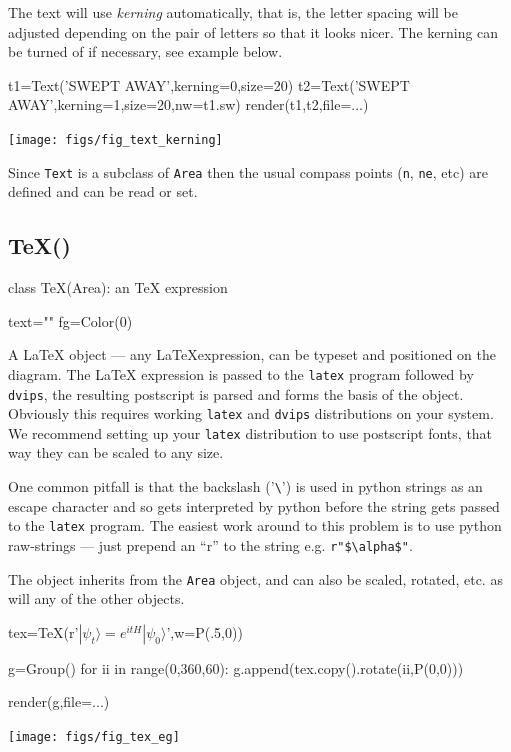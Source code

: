 \documentclass[a4paper]{book}
\begin{document}
The text will use \emph{kerning} automatically, that is, the
letter spacing will be adjusted depending on the pair of letters so
that it looks nicer. The kerning can be turned of if necessary, see
example below.
\begin{example}
\begin{python}
t1=Text('SWEPT AWAY',kerning=0,size=20)
t2=Text('SWEPT AWAY',kerning=1,size=20,nw=t1.sw)
render(t1,t2,file=...)
\end{python}
\begin{center}
  \texttt{[image: figs/fig\_text\_kerning]}
\end{center}
\end{example}

Since \Verb|Text| is a subclass of \Verb|Area| then the usual compass points
(\Verb|n|, \Verb|ne|, etc) are defined and can be read or set.

\subsection{TeX()}
\label{sec:tex}
\begin{python}
class TeX(Area):
    an TeX expression

    text=""
    fg=Color(0)
\end{python}

A \LaTeX{} object --- any \LaTeX expression, can be typeset and
positioned on the diagram.  The \LaTeX{} expression is passed to the
\Verb|latex| program followed by \Verb|dvips|, the resulting
postscript is parsed and forms the basis of the object. Obviously this
requires working \Verb|latex| and \Verb|dvips| distributions on your
system. We recommend setting up your \Verb|latex| distribution to
use postscript fonts, that way they can be scaled to any size.

One common pitfall is that the backslash ('\Verb|\|') is used in python
strings as an escape character and so gets interpreted by python before
the string gets passed to the \Verb|latex| program. The easiest work
around to this problem is to use python raw-strings --- just prepend an
``r'' to the string e.g. \Verb|r"$\alpha$"|.

The object inherits from the \Verb|Area| object, and can also be
scaled, rotated, etc. as will any of the other objects.
\begin{example}
\begin{python}
tex=TeX(r'$|\psi_t\rangle=e^{itH}|\psi_0\rangle$',w=P(.5,0))

g=Group()
for ii in range(0,360,60):
    g.append(tex.copy().rotate(ii,P(0,0)))

render(g,file=...)
\end{python}
\begin{center}
  \texttt{[image: figs/fig\_tex\_eg]}
\end{center}
\end{example}
\end{document}
